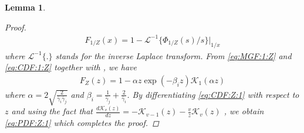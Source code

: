 \documentclass[conference]{IEEEtran}
\newtheorem{lemma}{Lemma}
\newcommand{\MGF}[2]{\Phi_{#1}\left({#2}\right)}
\newcommand{\CDF}[2]{F_{{#1}}\left({#2}\right)}
\newcommand{\Bessel}[2]{\mathcal{K}_{{#1}}\left({#2}\right)}
\newcommand{\snravei}[1]{\bar\gamma_{#1}}
\begin{document}
\begin{lemma}
\begin{proof}
\begin{eqnarray}
    \CDF{1/Z}{x}
     =1- \mathcal{L}^{-1}\{\MGF{1/Z}{s}/s\}|_{1/x}
\end{eqnarray}
%
%
where $\mathcal{L}^{-1}\{.\}$ stands for the inverse Laplace
transform. From \eqref{eq:MGF:1:Z} and \eqref{eq:CDF:1:Z} together
with \cite[eq.~(13.2.20)]{RK:66:Book}, we have%
%
%
\begin{align} \label{eq:CDF:Z:1}
    \CDF{Z}{z}
    =
    1 - \alpha z \exp\left(-\beta_i z\right)
    \Bessel{1}{\alpha z}
\end{align}
%
%
where $\alpha = 2\sqrt{\frac{2}{\snravei{i}\snravei{j}}}$ and
$\beta_i = \frac{1}{\snravei{j}} + \frac{2}{\snravei{i}}$. By
differentiating \eqref{eq:CDF:Z:1} with respect to $z$ and using the
fact that
$\tfrac{d\Bessel{v}{z}}{dz}=-\Bessel{v-1}{z}-\tfrac{v}{z}\Bessel{v}{z}$
\cite[eq.~(8.486.12)]{GR:00:Book}, we obtain \eqref{eq:PDF:Z:1}
which completes the proof.
\end{proof}
\end{lemma}
%
%
%
%
\end{document}

